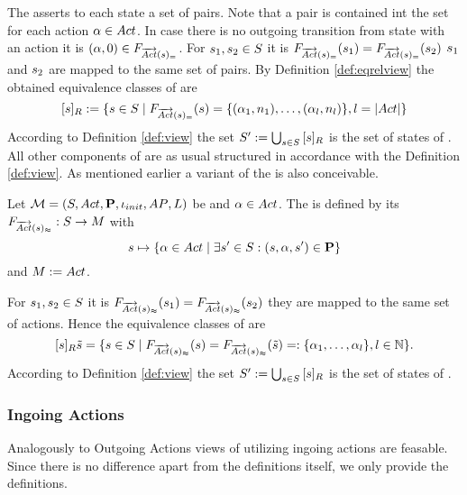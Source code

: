\documentclass[preview]{standalone}
\begin{document}
The \grpfctN asserts to each state a set of pairs. Note that a pair is contained int the set for each action ${\alpha} \in {Act}$. In case there is no outgoing transition from state \state with an action \action it is $({\alpha}, 0) \in {\ensuremath{{F_{{\overrightarrow{{Act}}}({s})_=}}}}$. For ${s}_1, {s}_2 \in {S}$ it is ${{F_{{\overrightarrow{{Act}}}({s})_=}}}({s}_1) = {{F_{{\overrightarrow{{Act}}}({s})_=}}}({s}_2)$ \iffN ${s}_1$ and ${s}_2$ are mapped to the same set of pairs. By Definition \ref{def:eqrelview} the obtained equivalence classes of \eqrelview are
\[
	{{[{s}]_{{R}}}} := \{{s} \in {S} \mid {\ensuremath{{F_{{\overrightarrow{{Act}}}({s})_=}}}}({s}) = \{({\alpha}_1, {n}_1), \dots, ({\alpha}_l, {n}_l)\}, l = |{Act}|\}
\]
According to Definition \ref{def:view} the set ${S}' := \bigcup_{{s} \in {S}} {{[{s}]_{{R}}}}$ is the set of states of \viewstrongoutactident. All other components of \viewstrongoutactident are as usual structured in accordance with the Definition \ref{def:view}.
As mentioned earlier a \outactidentweak variant of the \outactident \viewN is also conceivable.

\begin{definition}
	Let ${{{\mathcal{M}}}} = {{({S}, {Act}, {\textbf{P}}, {\iota_{init}}, {AP}, {L})}}$ be \chosengraphtypeN and ${\alpha} \in {Act}$. The \viewN \viewweakoutactident is defined by its \grpfctN ${{F_{{\overrightarrow{{Act}}}({s})_\approx}}} : {S} \to {\ensuremath{{M}}}$ with
	\[
	{s} \mapsto \{{\alpha} \in {Act} \mid \exists {s}' \in {S} : ({s}, {\alpha}, {s}') \in {\ensuremath{{\textbf{P}}}}\} 	
	\]
	and ${{M}} := {Act}$.
\end{definition}


For ${s}_1, {s}_2 \in {S}$ it is ${{F_{{\overrightarrow{{Act}}}({s})_\approx}}}({s}_1) = {{F_{{\overrightarrow{{Act}}}({s})_\approx}}}({s}_2)$ \iffN they are mapped to the same set of actions. Hence the equivalence classes of \eqrelview are
\[
	{{[{s}]_{{R}}}}{{\tilde{{s}}}} = \{ {s} \in {S} \mid {\ensuremath{{F_{{\overrightarrow{{Act}}}({s})_\approx}}}}({s}) = {{F_{{\overrightarrow{{Act}}}({s})_\approx}}}({\tilde{{s}}}) =: \{{\alpha}_1, \dots, {\alpha}_l\}, l \in {\mathbb{N}}\}.
\]
According to Definition \ref{def:view} the set ${S}' := \bigcup_{{s} \in {S}} {{[{s}]_{{R}}}}$ is the set of states of \viewweakoutactident.

\subsubsection{Ingoing Actions}
Analogously to Outgoing Actions views of utilizing ingoing actions are feasable. Since there is no difference apart from the definitions itself, we only provide the definitions.
\end{document}

